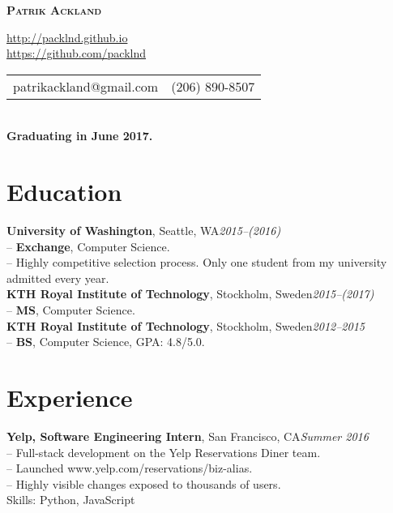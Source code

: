 \documentclass[10pt]{article}
\begin{document}

\centerline{\LARGE \textbf{\textsc{Patrik Ackland}}}

\begin{center}
  \url{http://packlnd.github.io}\\
  \vspace{0.20em}
  \url{https://github.com/packlnd}\\
  \vspace{0.20em}
  \begin{tabular}{l r}
    patrikackland@gmail.com&(206) 890-8507
  \end{tabular} \\
  \vspace{0.20em}
  \textbf{Graduating in June 2017.}
\end{center}

\section*{Education}
\hline
\vspace{0.10em}
\noindent\textbf{University of Washington}, Seattle, WA\hfill\textit{2015--(2016)}\\
\indent-- \textbf{Exchange}, Computer Science.\\
\indent-- Highly competitive selection process. Only one student from my university admitted every year.\\

\noindent\textbf{KTH Royal Institute of Technology}, Stockholm, Sweden\hfill\textit{2015--(2017)}\\
\indent-- \textbf{MS}, Computer Science.\\

\noindent\textbf{KTH Royal Institute of Technology}, Stockholm, Sweden\hfill\textit{2012--2015}\\
\indent-- \textbf{BS}, Computer Science, GPA: 4.8/5.0.\\

\section*{Experience}
\hline
\vspace{0.10em}
\noindent\textbf{Yelp, Software Engineering Intern}, San Francisco, CA\hfill\textit{Summer 2016}\\
\indent -- Full-stack development on the Yelp Reservations Diner team.\\
\indent -- Launched www.yelp.com/reservations/{biz-alias}.\\
\indent -- Highly visible changes exposed to thousands of users.\\
\indent Skills: Python, JavaScript\\
\end{document}
